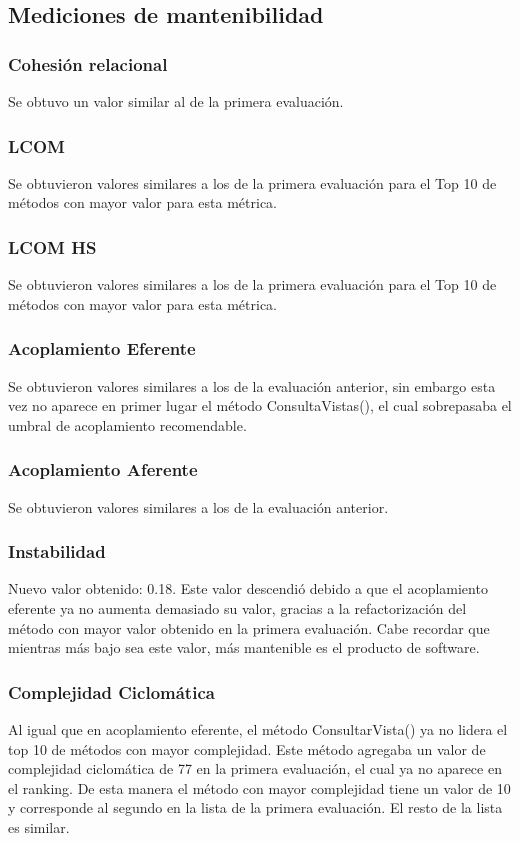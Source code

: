 \subsection{Mediciones de mantenibilidad}

\subsubsection{Cohesión relacional}
Se obtuvo un valor similar al de la primera evaluación.
\subsubsection{LCOM}
Se obtuvieron valores similares a los de la primera evaluación para el Top 10 de métodos
con mayor valor para esta métrica.
\subsubsection{LCOM HS}
Se obtuvieron valores similares a los de la primera evaluación para el Top 10 de métodos
con mayor valor para esta métrica.
\subsubsection{Acoplamiento Eferente}
Se obtuvieron valores similares a los de la evaluación anterior, sin embargo esta vez no aparece en primer lugar
el método ConsultaVistas(), el cual sobrepasaba el umbral de acoplamiento recomendable.
\subsubsection{Acoplamiento Aferente}
Se obtuvieron valores similares a los de la evaluación anterior.
\subsubsection{Instabilidad}
Nuevo valor obtenido: 0.18.
Este valor descendió debido a que el acoplamiento eferente ya no aumenta
demasiado su valor, gracias a la refactorización del método con mayor valor obtenido en la primera evaluación.
Cabe recordar que mientras más bajo sea este valor, más mantenible es el producto de software.
\subsubsection{Complejidad Ciclomática}
Al igual que en acoplamiento eferente, el método ConsultarVista() ya no lidera el top 10 de métodos
con mayor complejidad. Este método agregaba un valor de complejidad
ciclomática de 77 en la primera evaluación, el cual ya no aparece en el ranking.
De esta manera el método con mayor complejidad tiene un valor de 10 y
corresponde al segundo en la lista de la primera evaluación. El resto de la lista
es similar.
